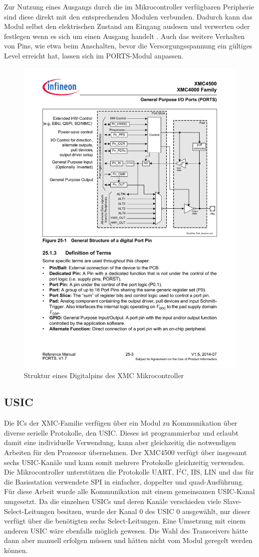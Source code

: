 Zur Nutzung eines Ausgangs durch die im Mikrocontroller verfügbaren Peripherie sind diese direkt mit den entsprechenden Modulen verbunden. Dadurch kann das Modul selbst den elektrischen Zustand am Eingang auslesen und verwerten oder festlegen wenn es sich um einen Ausgang handelt \cite{XMC-Reference}. 
Auch das weitere Verhalten von Pins, wie etwa  beim Anschalten, bevor die Versorgungsspannung ein gültiges Level erreicht hat, lassen sich im PORTS-Modul anpassen.
\begin{figure}[h]
	\centering
	\includegraphics[width=0.7\linewidth]{Abbildungen/StructureDigitalPin}
	\caption{Struktur eines Digitalpins des XMC Mikrocontroller \cite{XMC-Reference}}
	\label{fig:structuredigitalpin}
\end{figure}


\subsection{USIC}
Die \acp{IC} der XMC-Familie verfügen über ein Modul zu Kommunikation über diverse serielle Protokolle, den \acf{USIC}. Dieses ist programmierbar und erlaubt damit eine individuelle Verwendung, kann aber gleichzeitig die notwendigen Arbeiten für den Prozessor übernehmen. Der XMC4500 verfügt über insgesamt sechs \ac{USIC}-Kanäle und kann somit mehrere Protokolle gleichzeitig verwenden. Die Mikrocontroller unterstützen die  Protokolle UART, I$^{2}$C, IIS, LIN und das für die Basisstation verwendete SPI in einfacher, doppelter und quad-Ausführung. Für diese Arbeit wurde alle Kommunikation mit einem gemeinsamen \acs{USIC}-Kanal umgesetzt. Da die einzelnen \acp{USIC} und deren Kanäle verschieden viele Slave-Select-Leitungen besitzen, wurde der Kanal $0$ des \ac{USIC} $0$ ausgewählt, nur dieser verfügt über die benötigten sechs Select-Leitungen. Eine Umsetzung mit einem anderen USIC wäre ebenfalls möglich gewesen. Die Wahl des Transceivers hätte dann aber manuell erfolgen müssen und hätten nicht vom Modul geregelt werden können.


